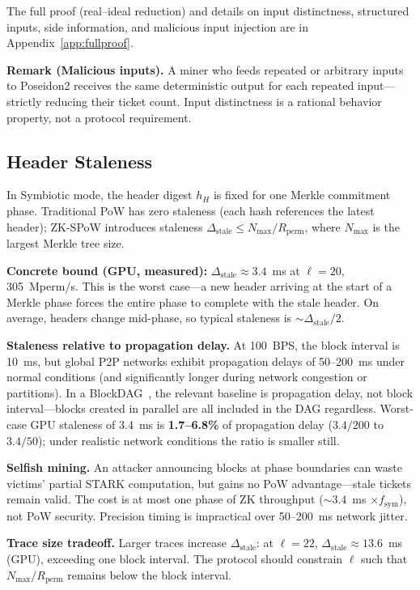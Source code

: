 \documentclass[11pt,a4paper]{article}
\begin{document}
The full proof (real--ideal reduction) and details on input distinctness, structured inputs, side information, and malicious input injection are in Appendix~\ref{app:fullproof}.

\textbf{Remark (Malicious inputs).} A miner who feeds repeated or arbitrary inputs to Poseidon2 receives the same deterministic output for each repeated input---strictly reducing their ticket count. Input distinctness is a rational behavior property, not a protocol requirement.

\subsection{Header Staleness}
\label{sec:staleness}

In Symbiotic mode, the header digest $h_H$ is fixed for one Merkle commitment phase. Traditional PoW has zero staleness (each hash references the latest header); ZK-SPoW introduces staleness $\Delta_{\mathrm{stale}} \leq N_{\max}/R_{\mathrm{perm}}$, where $N_{\max}$ is the largest Merkle tree size.

\textbf{Concrete bound (GPU, measured):} $\Delta_{\mathrm{stale}} \approx 3.4$~ms at $\ell = 20$, 305~Mperm/s. This is the worst case---a new header arriving at the start of a Merkle phase forces the entire phase to complete with the stale header. On average, headers change mid-phase, so typical staleness is ${\sim}\Delta_{\mathrm{stale}}/2$.

\textbf{Staleness relative to propagation delay.} At 100~BPS, the block interval is 10~ms, but global P2P networks exhibit propagation delays of 50--200~ms under normal conditions (and significantly longer during network congestion or partitions). In a BlockDAG~\cite{dagknight}, the relevant baseline is propagation delay, not block interval---blocks created in parallel are all included in the DAG regardless. Worst-case GPU staleness of 3.4~ms is \textbf{1.7--6.8\%} of propagation delay ($3.4/200$ to $3.4/50$); under realistic network conditions the ratio is smaller still.

\textbf{Selfish mining.} An attacker announcing blocks at phase boundaries can waste victims' partial STARK computation, but gains no PoW advantage---stale tickets remain valid. The cost is at most one phase of ZK throughput (${\sim}3.4$~ms $\times f_{\mathrm{sym}}$), not PoW security. Precision timing is impractical over 50--200~ms network jitter.

\textbf{Trace size tradeoff.} Larger traces increase $\Delta_{\mathrm{stale}}$: at $\ell = 22$, $\Delta_{\mathrm{stale}} \approx 13.6$~ms (GPU), exceeding one block interval. The protocol should constrain $\ell$ such that $N_{\max}/R_{\mathrm{perm}}$ remains below the block interval.
\end{document}
